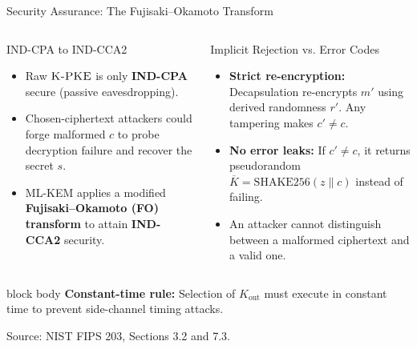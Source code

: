 \documentclass[aspectratio=169,11pt]{beamer}
\newcommand{\source}[1]{\par\vspace{-0.15cm}\hfill{\fontsize{4.5}{5.2}\selectfont\color{Slate!65}Source: NIST FIPS 203, #1.}}
\newcommand{\PKE}{\textsc{K-PKE}}
\begin{document}
\begin{frame}{Security Assurance: The Fujisaki--Okamoto Transform}
  \begin{columns}[T,onlytextwidth]
      \begin{block}{IND-CPA to IND-CCA2}
        \footnotesize
        \begin{itemize}
          \setlength{\itemsep}{0.25em}
          \item Raw $\PKE$ is only \textbf{IND-CPA} secure (passive eavesdropping).
          \item Chosen-ciphertext attackers could forge malformed $c$ to probe decryption failure and recover the secret $s$.
          \item ML-KEM applies a modified \textbf{Fujisaki--Okamoto (FO) transform} to attain \textbf{IND-CCA2} security.
        \end{itemize}
      \end{block}

      \begin{alertblock}{Implicit Rejection vs. Error Codes}
        \footnotesize
        \begin{itemize}
          \setlength{\itemsep}{0.25em}
          \item \textbf{Strict re-encryption:} Decapsulation re-encrypts $m'$ using derived randomness $r'$. Any tampering makes $c' \neq c$.
          \item \textbf{No error leaks:} If $c' \neq c$, it returns pseudorandom $\overline{K} = \mathrm{SHAKE256}(z \parallel c)$ instead of failing.
          \item An attacker cannot distinguish between a malformed ciphertext and a valid one.
        \end{itemize}
      \end{alertblock}
  \end{columns}
  \vspace{0.2cm}
  \begin{beamercolorbox}[rounded=true,sep=0.35em,wd=\linewidth,center]{block body}
    \scriptsize
    \textbf{Constant-time rule:} Selection of $K_{\mathrm{out}}$ must execute in constant time to prevent side-channel timing attacks.
  \end{beamercolorbox}
  \source{Sections 3.2 and 7.3}
\end{frame}
\end{document}
